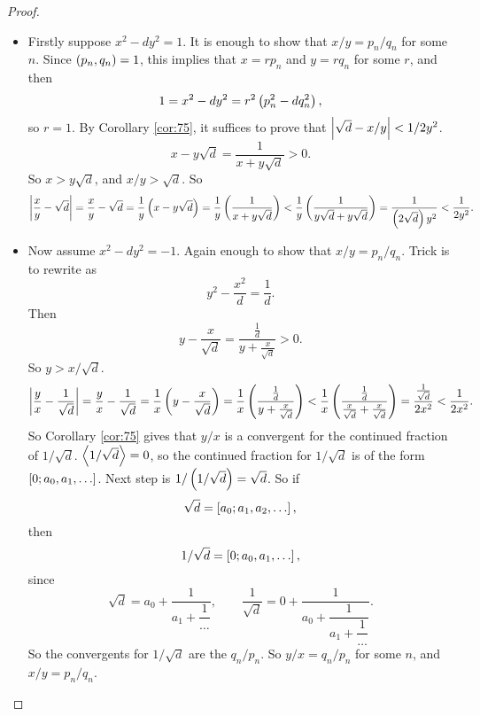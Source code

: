 \begin{proof}
\hfill
\begin{itemize}
\item Firstly suppose $ x^2 - dy^2 = 1 $. It is enough to show that $ x / y = p_n / q_n $ for some $ n $. Since $ \left( p_n, q_n \right) = 1 $, this implies that $ x = rp_n $ and $ y = rq_n $ for some $ r $, and then
$$ 1 = x^2 - dy^2 = r^2\left( p_n^2 - dq_n^2 \right), $$
so $ r = 1 $. By Corollary \ref{cor:75}, it suffices to prove that $ \left\lvert \sqrt{d} - x / y \right\rvert < 1 / 2y^2 $.
$$ x - y\sqrt{d} = \dfrac{1}{x + y\sqrt{d}} > 0. $$
So $ x > y\sqrt{d} $, and $ x / y > \sqrt{d} $. So
$$ \left\lvert \dfrac{x}{y} - \sqrt{d} \right\rvert = \dfrac{x}{y} - \sqrt{d} = \dfrac{1}{y}\left( x - y\sqrt{d} \right) = \dfrac{1}{y}\left( \dfrac{1}{x + y\sqrt{d}} \right) < \dfrac{1}{y}\left( \dfrac{1}{y\sqrt{d} + y\sqrt{d}} \right) = \dfrac{1}{\left( 2\sqrt{d} \right)y^2} < \dfrac{1}{2y^2}. $$
\item Now assume $ x^2 - dy^2 = -1 $. Again enough to show that $ x / y = p_n / q_n $. Trick is to rewrite as
$$ y^2 - \dfrac{x^2}{d} = \dfrac{1}{d}. $$
Then
$$ y - \dfrac{x}{\sqrt{d}} = \dfrac{\tfrac{1}{d}}{y + \tfrac{x}{\sqrt{d}}} > 0. $$
So $ y > x / \sqrt{d} $.
$$ \left\lvert \dfrac{y}{x} - \dfrac{1}{\sqrt{d}} \right\rvert = \dfrac{y}{x} - \dfrac{1}{\sqrt{d}} = \dfrac{1}{x}\left( y - \dfrac{x}{\sqrt{d}} \right) = \dfrac{1}{x}\left( \dfrac{\tfrac{1}{d}}{y + \tfrac{x}{\sqrt{d}}} \right) < \dfrac{1}{x}\left( \dfrac{\tfrac{1}{d}}{\tfrac{x}{\sqrt{d}} + \tfrac{x}{\sqrt{d}}} \right) = \dfrac{\tfrac{1}{\sqrt{d}}}{2x^2} < \dfrac{1}{2x^2}. $$
So Corollary \ref{cor:75} gives that $ y / x $ is a convergent for the continued fraction of $ 1 / \sqrt{d} $. $ \left\langle 1 / \sqrt{d} \right\rangle = 0 $, so the continued fraction for $ 1 / \sqrt{d} $ is of the form $ \sb{0; a_0, a_1, \dots} $. Next step is $ 1 / \left( 1 / \sqrt{d} \right) = \sqrt{d} $. So if
$$ \sqrt{d} = \sb{a_0; a_1, a_2, \dots}, $$
then
$$ 1 / \sqrt{d} = \sb{0; a_0, a_1, \dots}, $$
since
$$ \sqrt{d} = a_0 + \dfrac{1}{a_1 + \dfrac{1}{\dots}}, \qquad \dfrac{1}{\sqrt{d}} = 0 + \dfrac{1}{a_0 + \dfrac{1}{a_1 + \dfrac{1}{\dots}}}. $$
So the convergents for $ 1 / \sqrt{d} $ are the $ q_n / p_n $. So $ y / x = q_n / p_n $ for some $ n $, and $ x / y = p_n / q_n $.
\end{itemize}
\end{proof}

